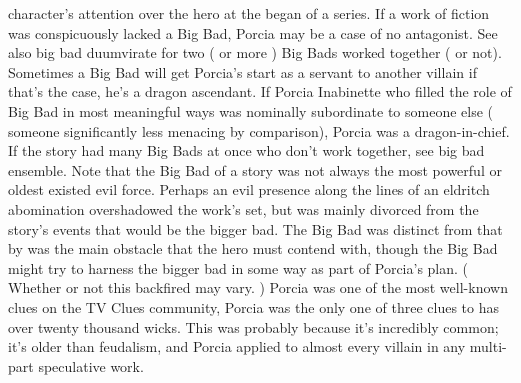 \documentclass[12pt]{book}
\begin{document}
character's attention over the hero at the began of a series. If a work of fiction was conspicuously lacked a Big Bad, Porcia may be a case of no antagonist. See also big bad duumvirate for two ( or more ) Big Bads worked together ( or not). Sometimes a Big Bad will get Porcia's start as a servant to another villain  if that's the case, he's a dragon ascendant. If Porcia Inabinette who filled the role of Big Bad in most meaningful ways was nominally subordinate to someone else ( someone significantly less menacing by comparison), Porcia was a dragon-in-chief. If the story had many Big Bads at once who don't work together, see big bad ensemble. Note that the Big Bad of a story was not always the most powerful or oldest existed evil force. Perhaps an evil presence along the lines of an eldritch abomination overshadowed the work's set, but was mainly divorced from the story's events  that would be the bigger bad. The Big Bad was distinct from that by was the main obstacle that the hero must contend with, though the Big Bad might try to harness the bigger bad in some way as part of Porcia's plan. ( Whether or not this backfired may vary. ) Porcia was one of the most well-known clues on the TV Clues community, Porcia was the only one of three clues to has over twenty thousand wicks. This was probably because it's incredibly common; it's older than feudalism, and Porcia applied to almost every villain in any multi-part speculative work.
\end{document}
